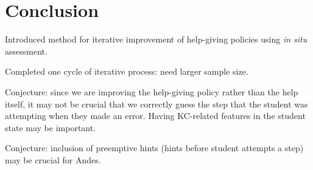 \documentclass{edm_template}
\begin{document}
\section{Conclusion}

Introduced method for iterative improvement of help-giving policies using 
{\em in situ} assessment.

Completed one cycle of iterative process:  need larger sample size.

Conjecture:  since we are improving the help-giving policy rather than the
help itself, it may not be crucial that we correctly guess the step
that the student was attempting when they made an error.  Having
KC-related features in the student state may be important.

Conjecture: inclusion of preemptive hints (hints before student attempts
a step) may be crucial for Andes. 



\end{document}

